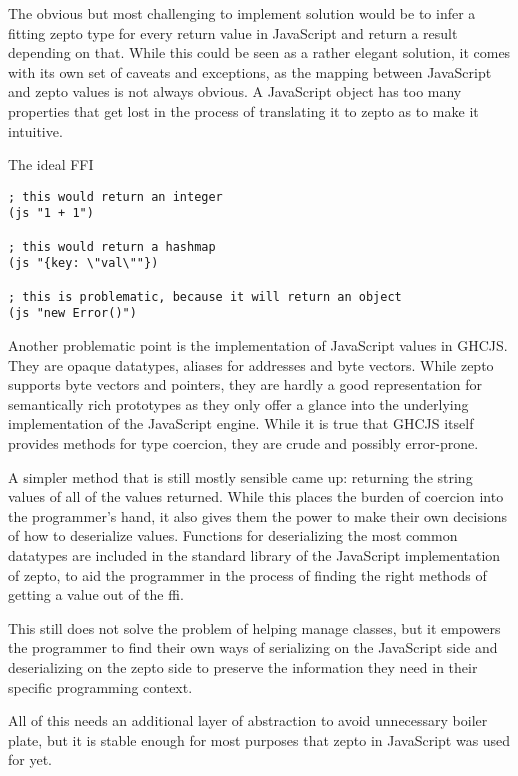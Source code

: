 \documentclass[oneside,11pt,xetex]{scrbook}
\begin{document}
The obvious but most challenging to implement solution would be to infer a fitting zepto
type for every return value in JavaScript and return a result depending on that. While
this could be seen as a rather elegant solution, it comes with its own set of caveats
and exceptions, as the mapping between JavaScript and zepto values is not always obvious.
A JavaScript object has too many properties that get lost in the process of translating
it to zepto as to make it intuitive.

\begin{listing}[H]
\caption{The ideal FFI}
\begin{verbatim}
; this would return an integer
(js "1 + 1")

; this would return a hashmap
(js "{key: \"val\""})

; this is problematic, because it will return an object
(js "new Error()")
\end{verbatim}
\end{listing}

Another problematic point is the implementation of JavaScript values in GHCJS. They
are opaque datatypes, aliases for addresses and byte vectors. While zepto supports
byte vectors and pointers, they are hardly a good representation for semantically rich
prototypes as they only offer a glance into the underlying implementation of the
JavaScript engine. While it is true that GHCJS itself provides methods for type
coercion, they are crude and possibly error-prone.

A simpler method that is still mostly sensible came up: returning the string
values of all of the values returned. While this places the burden of coercion
into the programmer's hand, it also gives them the power to make their own 
decisions of how to deserialize values. Functions for deserializing the most
common datatypes are included in the standard library of the JavaScript
implementation of zepto, to aid the programmer in the process of finding
the right methods of getting a value out of the \gls{ffi}.

This still does not solve the problem of helping manage classes, but it empowers
the programmer to find their own ways of serializing on the JavaScript side
and deserializing on the zepto side to preserve the information they need in
their specific programming context.

All of this needs an additional layer of abstraction to avoid unnecessary
boiler plate, but it is stable enough for most purposes that zepto in JavaScript
was used for yet.
\end{document}
